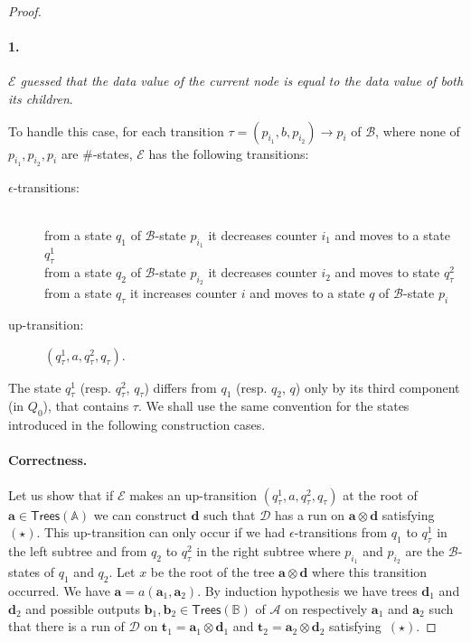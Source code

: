 \documentclass{CSML}
\newcommand\ra{\ensuremath{\rightarrow}}
\newcommand\A{\ensuremath{\mathbb{A}}\xspace}
\newcommand\B{\mathbb{B}}
\newcommand\Aa{\mathcal{A}}
\newcommand\Ba{\mathcal{B}}
\newcommand\Da{\mathcal{D}}
\newcommand\Ea{\mathcal{E}}
\newcommand\Trees{\mathsf{Trees}}
\newcommand\tree{\boldsymbol{t}}
\newcommand\atree{\boldsymbol{a}}
\newcommand\btree{\boldsymbol{b}}
\newcommand\dtree{\boldsymbol{d}}
\begin{document}
\begin{proof}
\medskip


\paragraph{\bf 1.}
\emph{$\Ea$ guessed that the data value of the current node 
 is equal to the data value of both its children}.

\noindent
To handle this case, for each transition $\tau=(p_{i_1},b,p_{i_2}) \ra p_{i}$ of $\Ba$, 
where none of $p_{i_1},p_{i_2},p_i$ are $\#$-states, $\Ea$ has the following transitions:
\begin{description}
\item[\rm $\epsilon$-transitions:] \quad\\
from a state $q_1$ of $\Ba$-state $p_{i_1}$ 
it decreases counter $i_1$ 
and moves to a state $q_\tau^1$\\ from a state $q_2$ of $\Ba$-state $p_{i_2}$
it decreases counter $i_2$ 
and moves to state $q_\tau^2$\\
from a state $q_\tau$ 
it increases counter $i$ 
and moves to a state $q$ of $\Ba$-state $p_i$

\item[\rm up-transition:]
$(q_\tau^1,a,q_\tau^2,q_\tau)$.
\end{description}
The state $q_\tau^1$ (resp. $q_\tau^2$, $q_\tau$) 
differs from $q_1$  (resp. $q_2$, $q$)
only by its third component (in $Q_0$), that contains $\tau$.
We shall use the same convention for the states introduced in the 
following construction cases.

\paragraph{\bf Correctness.} 
Let us show that if $\Ea$ makes an up-transition $(q^1_\tau,a,q^2_\tau,q_\tau)$  
at the root of $\atree \in \Trees(\A)$ we can construct $\dtree$ such that $\Da$
has a run on $\atree\otimes\dtree$ satisfying~$(\star)$.
This up-transition can only occur if we had $\epsilon$-transitions from $q_1$ to
$q_\tau^1$ in the left subtree and from $q_2$ to
$q_\tau^2$ in the right subtree where $p_{i_1}$ and $p_{i_2}$ are the
$\Ba$-states of $q_1$ and $q_2$.
Let $x$ be the root of the tree $\atree\otimes\dtree$ where this transition
occurred. We have $\atree = a(\atree_1,\atree_2)$. 
By induction hypothesis we have trees
$\dtree_1$ and $\dtree_2$ 
and possible outputs $\btree_1, \btree_2 \in \Trees(\B)$ of $\Aa$ 
on respectively $\atree_1$ and $\atree_2$ 
such that there is a run of $\Da$ on 
$\tree_1 = \atree_1\otimes\dtree_1$ and $\tree_2 = \atree_2\otimes\dtree_2$ satisfying~$(\star)$.


\end{proof}
\end{document}
